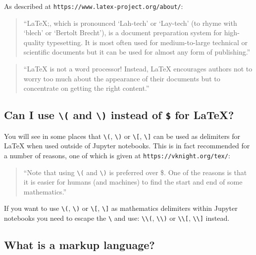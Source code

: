 As described at \texttt{https://www.latex-project.org/about/}:

\begin{quote}
``LaTeX;, which is pronounced `Lah-tech' or `Lay-tech' (to rhyme with `blech' or
`Bertolt Brecht'), is a document preparation system for high-quality
typesetting. It is most often used for medium-to-large technical or scientific
documents but it can be used for almost any form of publishing.''
\end{quote}

\begin{quote}
``LaTeX\; is not a word processor! Instead, LaTeX\; encourages authors not to worry
too much about the appearance of their documents but to concentrate on getting
the right content.''
\end{quote}

\subsection{Can I use \texttt{\textbackslash(} and \texttt{\textbackslash)} instead of \texttt{\$} for \LaTeX?}

You will see in some places that \texttt{\textbackslash(},
\texttt{\textbackslash)} or \texttt{\textbackslash[},
\texttt{\textbackslash]} can be used as delimiters for
\LaTeX\; when used outside of Jupyter notebooks. This is in fact recommended for a
number of reasons, one of which is given at
\texttt{https://vknight.org/tex/}:

\begin{quote}
``Note that using \texttt{\textbackslash(} and \texttt{\textbackslash)} is preferred over \$. One of the reasons is that it
is easier for humans (and machines) to find the start and end of some
mathematics.''
\end{quote}

If you want to use \texttt{\textbackslash(}, \texttt{\textbackslash)} or
\texttt{\textbackslash[}, \texttt{\textbackslash]} as
mathematics delimiters within Jupyter notebooks you need to escape the
\texttt{\textbackslash} and use: \texttt{\textbackslash\textbackslash(},
\texttt{\textbackslash\textbackslash)} or
\texttt{\textbackslash\textbackslash[},
\texttt{\textbackslash\textbackslash]} instead.

\subsection{What is a markup language?}
\label{\detokenize{tools-for-mathematics/01-using-notebooks/why/main:what-is-a-markup-language}}


